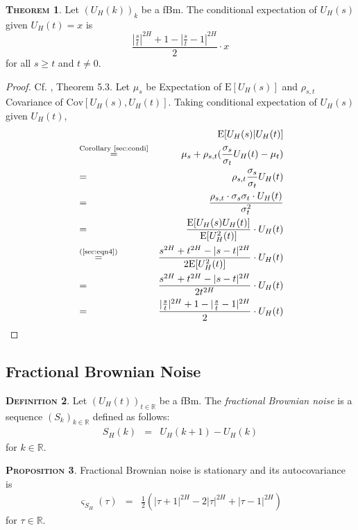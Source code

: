 \documentclass[a4paper, twoside, 11pt]{article}
\theoremstyle{definition}
\newtheorem{definition}{\scshape Definition}[section]
\newtheorem{theorem}[definition]{\scshape Theorem}
\newtheorem{proposition}[definition]{\scshape Proposition}
\begin{document}
	\begin{theorem}
	  Let $(U_H(k))_{k}$ be a fBm. The conditional expectation of $U_H(s)$  given $U_H(t)=x$ is
	\begin{equation*}
	  \frac{|\frac{s}{t}|^{2H} + 1 - |\frac{s}{t} - 1|^{2H}}{2} \cdot x
	\end{equation*}
	for all $ s \ge t$ and $t \neq 0$.
	\end{theorem}
	\begin{proof}
	  Cf. \cite{mandelbrot}, Theorem 5.3. Let $\mu_s$ be Expectation of $\mathrm{E}[U_H(s)]$ and $\rho_{s,t}$ Covariance of $\mathrm{Cov}[U_H(s), U_H(t)]$. Taking conditional expectation of $U_H(s)$ given $U_H(t)$,
	  \begin{eqnarray*}
	  &&\mathrm{E}[U_H(s)|U_H(t)]\\
	  &\overset{\text{Corollary \ref{sec:condi}}}{=}& \mu_s + \rho_{s,t} (\frac{\sigma_s}{\sigma_t}U_H(t) - \mu_t)\\
	  &=& \rho_{s,t}\frac{\sigma_s}{\sigma_t}U_H(t)\\
	  &=& \frac{\rho_{s,t}\cdot\sigma_s\sigma_t\cdot U_H(t)}{\sigma_t^2}\\
	  &=& \frac{\mathrm{E}[U_H(s)U_H(t)]}{\mathrm{E}[U_H^2(t)]} \cdot U_H(t)\\
	  &\overset{\text{(\ref{sec:eqn4})}}{=}& \frac{s^{2H} + t^{2H} - |s-t|^{2H}}{2\mathrm{E}[U_H^2(t)]}\cdot U_H(t)\\
	  &=&  \frac{s^{2H} + t^{2H} - |s-t|^{2H}}{2t^{2H}}\cdot U_H(t)\\
	  &=& \frac{|\frac{s}{t}|^{2H} + 1 - |\frac{s}{t} - 1|^{2H}}{2} \cdot U_H(t)
	  \end{eqnarray*}
	\end{proof}

	\subsection{Fractional Brownian Noise}
	\begin{definition}
	  Let $(U_H(t))_{t\in \mathbb{R}}$ be a fBm. The \emph{fractional Brownian noise} is a sequence $(S_k)_{k\in \mathbb{R}}$ defined as follows:
	\begin{eqnarray*}
	  S_H(k) &=& U_H(k+1) - U_H(k)
	\end{eqnarray*}
	for $k \in \mathbb{R}$.
	\end{definition}
	\begin{proposition}
	  Fractional Brownian noise is stationary and its autocovariance is 
	  \begin{eqnarray}
		\varsigma_{S_H}(\tau) &=&  \frac{1}{2} (|\tau + 1|^{2H} - 2|\tau|^{2H} + |\tau-1|^{2H})
	  \label{sec:auto}
	  \end{eqnarray}
	  for $\tau \in \mathbb{R}$.
	\end{proposition}
\end{document}
